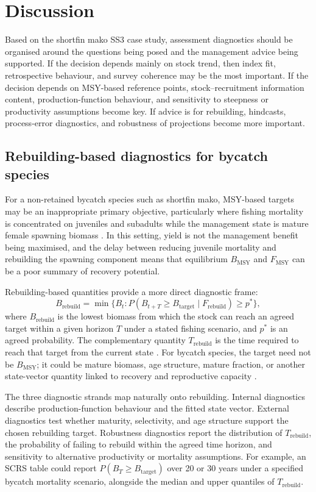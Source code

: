 \documentclass[11pt,a4paper]{article}
\begin{document}
\section{Discussion}

Based on the shortfin mako SS3 case study, assessment diagnostics should be organised around the questions being posed and the management advice being supported. If the decision depends mainly on stock trend, then index fit, retrospective behaviour, and survey coherence may be the most important. If the decision depends on MSY-based reference points, stock--recruitment information content, production-function behaviour, and sensitivity to steepness or productivity assumptions become key. If advice is for rebuilding, hindcasts, process-error diagnostics, and robustness of projections become more important.

\subsection{Rebuilding-based diagnostics for bycatch species}

For a non-retained bycatch species such as shortfin mako, MSY-based targets may be an inappropriate primary objective, particularly where fishing mortality is concentrated on juveniles and subadults while the management state is mature female spawning biomass \citep{winker2020age,Winker2025assessing}. In this setting, yield is not the management benefit being maximised, and the delay between reducing juvenile mortality and rebuilding the spawning component means that equilibrium $B_{\mathrm{MSY}}$ and $F_{\mathrm{MSY}}$ can be a poor summary of recovery potential.

Rebuilding-based quantities provide a more direct diagnostic frame:
\[
B_{\mathrm{rebuild}} = \min\{B_t : P(B_{t+T} \ge B_{\mathrm{target}} \mid F_{\mathrm{rebuild}}) \ge p^\ast\},
\]
where \(B_{\mathrm{rebuild}}\) is the lowest biomass from which the stock can reach an agreed target within a given horizon \(T\) under a stated fishing scenario, and \(p^\ast\) is an agreed probability. The complementary quantity \(T_{\mathrm{rebuild}}\) is the time required to reach that target from the current state \citep{kell2026rebuild}. For bycatch species, the target need not be \(B_{\mathrm{MSY}}\); it could be mature biomass, age structure, mature fraction, or another state-vector quantity linked to recovery and reproductive capacity \citep{griffiths2024including}.

The three diagnostic strands map naturally onto rebuilding. Internal diagnostics describe production-function behaviour and the fitted state vector. External diagnostics test whether maturity, selectivity, and age structure support the chosen rebuilding target. Robustness diagnostics report the distribution of \(T_{\mathrm{rebuild}}\), the probability of failing to rebuild within the agreed time horizon, and sensitivity to alternative productivity or mortality assumptions. For example, an SCRS table could report \(P(B_T \ge B_{\mathrm{target}})\) over 20 or 30 years under a specified bycatch mortality scenario, alongside the median and upper quantiles of \(T_{\mathrm{rebuild}}\).
\end{document}
